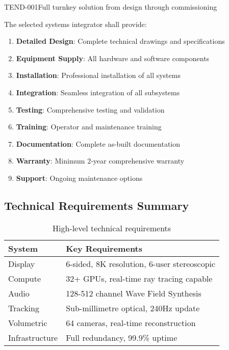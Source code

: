 \begin{requirement}{TEND-001}{Full turnkey solution from design through commissioning}

The selected systems integrator shall provide:

\begin{enumerate}
    \item \textbf{Detailed Design}: Complete technical drawings and specifications
    \item \textbf{Equipment Supply}: All hardware and software components
    \item \textbf{Installation}: Professional installation of all systems
    \item \textbf{Integration}: Seamless integration of all subsystems
    \item \textbf{Testing}: Comprehensive testing and validation
    \item \textbf{Training}: Operator and maintenance training
    \item \textbf{Documentation}: Complete as-built documentation
    \item \textbf{Warranty}: Minimum 2-year comprehensive warranty
    \item \textbf{Support}: Ongoing maintenance options
\end{enumerate}

\subsection{Technical Requirements Summary}

\begin{table}[H]
\centering
\begin{tabularx}{\textwidth}{@{}lX@{}}
\toprule
\textbf{System} & \textbf{Key Requirements} \\
\midrule
Display & 6-sided, 8K resolution, 6-user stereoscopic \\
Compute & 32+ GPUs, real-time ray tracing capable \\
Audio & 128-512 channel Wave Field Synthesis \\
Tracking & Sub-millimetre optical, 240Hz update \\
Volumetric & 64 cameras, real-time reconstruction \\
Infrastructure & Full redundancy, 99.9\% uptime \\
\bottomrule
\end{tabularx}
\caption{High-level technical requirements}
\end{table}


\end{requirement}
